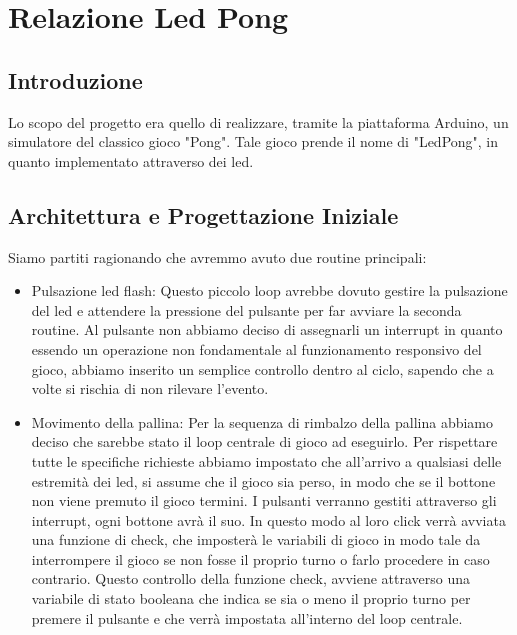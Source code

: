 \documentclass[a4paper]{article}
\begin{document}
\section*{Relazione Led Pong} 
\subsection*{Introduzione}
Lo scopo del progetto era quello di realizzare, tramite la piattaforma Arduino, un simulatore del classico gioco "Pong". Tale gioco prende il nome di "LedPong", in quanto implementato attraverso dei led.
\subsection*{Architettura e Progettazione Iniziale}
Siamo partiti ragionando che avremmo avuto due routine principali:
\begin{itemize}
\item {Pulsazione led flash}:
Questo piccolo loop avrebbe dovuto gestire la pulsazione del led e attendere la pressione del pulsante per far avviare la seconda routine. Al pulsante non abbiamo deciso di assegnarli un interrupt in quanto essendo un operazione non fondamentale al funzionamento responsivo del gioco, abbiamo inserito un semplice controllo dentro al ciclo, sapendo che a volte si rischia di non rilevare l'evento.
\item {Movimento della pallina}:
Per la sequenza di rimbalzo della pallina abbiamo deciso che sarebbe stato il loop centrale di gioco  ad eseguirlo.
Per rispettare tutte le specifiche richieste abbiamo impostato che all'arrivo a qualsiasi delle estremità dei led, si assume che il gioco sia perso, in modo che se il bottone non viene premuto il gioco termini.
I pulsanti verranno gestiti attraverso gli interrupt, ogni bottone avrà il suo. In questo modo al loro click verrà avviata una funzione di check, che imposterà le variabili di gioco in modo tale da interrompere il gioco se non fosse il proprio turno o farlo procedere in caso contrario.
Questo controllo della funzione check, avviene attraverso una variabile di stato booleana che indica se sia o meno il proprio turno per premere il pulsante e che verrà impostata all'interno del loop centrale.
\end{itemize}
\end{document}
